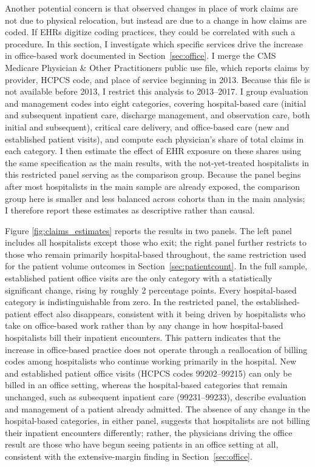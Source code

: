\documentclass[12pt]{article}
\begin{document}
Another potential concern is that observed changes in place of work claims are not due to physical relocation, but instead are due to a change in how claims are coded. If EHRs digitize coding practices, they could be correlated with such a procedure. In this section, I investigate which specific services drive the increase in office-based work documented in Section~\ref{sec:office}. I merge the CMS Medicare Physician \& Other Practitioners public use file, which reports claims by provider, HCPCS code, and place of service beginning in 2013. Because this file is not available before 2013, I restrict this analysis to 2013--2017. I group evaluation and management codes into eight categories, covering hospital-based care (initial and subsequent inpatient care, discharge management, and observation care, both initial and subsequent), critical care delivery, and office-based care (new and established patient visits), and compute each physician's share of total claims in each category. I then estimate the effect of EHR exposure on these shares using the same specification as the main results, with the not-yet-treated hospitalists in this restricted panel serving as the comparison group. Because the panel begins after most hospitalists in the main sample are already exposed, the comparison group here is smaller and less balanced across cohorts than in the main analysis; I therefore report these estimates as descriptive rather than causal.

Figure \ref{fig:claims_estimates} reports the results in two panels. The left panel includes all hospitalists except those who exit; the right panel further restricts to those who remain primarily hospital-based throughout, the same restriction used for the patient volume outcomes in Section~\ref{sec:patientcount}. In the full sample, established patient office visits are the only category with a statistically significant change, rising by roughly 2 percentage points. Every hospital-based category is indistinguishable from zero. In the restricted panel, the established-patient effect also disappears, consistent with it being driven by hospitalists who take on office-based work rather than by any change in how hospital-based hospitalists bill their inpatient encounters. This pattern indicates that the increase in office-based practice does not operate through a reallocation of billing codes among hospitalists who continue working primarily in the hospital. New and established patient office visits (HCPCS codes 99202--99215) can only be billed in an office setting, whereas the hospital-based categories that remain unchanged, such as subsequent inpatient care (99231--99233), describe evaluation and management of a patient already admitted. The absence of any change in the hospital-based categories, in either panel, suggests that hospitalists are not billing their inpatient encounters differently; rather, the physicians driving the office result are those who have begun seeing patients in an office setting at all, consistent with the extensive-margin finding in Section~\ref{sec:office}.
\end{document}
